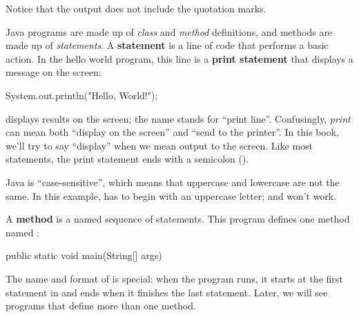 Notice that the output does not include the quotation marks.




Java programs are made up of {\em class} and {\em method} definitions, and methods are made up of {\em statements}.
A {\bf statement} is a line of code that performs a basic action.
In the hello world program, this line is a {\bf print statement} that displays a message on the screen:

\begin{code}
System.out.println("Hello, World!");
\end{code}


 displays results on the screen; the name  stands for ``print line''.
Confusingly, {\em print} can mean both ``display on the screen'' and ``send to the printer''.
In this book, we'll try to say ``display'' when we mean output to the screen.
Like most statements, the print statement ends with a semicolon (\java{;}).


Java is ``case-sensitive'', which means that uppercase and lowercase are not the same.
In this example,  has to begin with an uppercase letter;  and  won't work.


A {\bf method} is a named sequence of statements.
This program defines one method named :

\begin{code}
public static void main(String[] args)
\end{code}


The name and format of  is special: when the program runs, it starts at the first statement in  and ends when it finishes the last statement.
Later, we will see programs that define more than one method.


